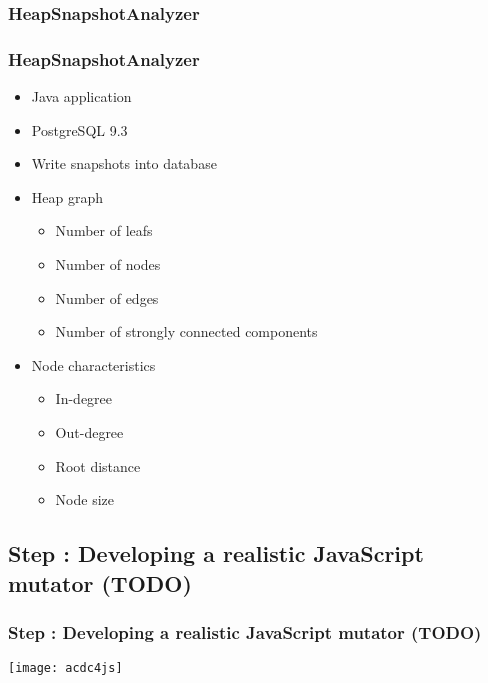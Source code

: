 \subsubsection{HeapSnapshotAnalyzer}
\begin{frame}
	\frametitle{HeapSnapshotAnalyzer}
	\begin{itemize}
		\item Java application
		\item PostgreSQL 9.3
		\item Write snapshots into database
			
		\pause
			
		\item Heap graph
		\begin{itemize}
			 \item Number of leafs
			 \item Number of nodes
			 \item Number of edges
			 \item Number of strongly connected components
		\end{itemize}
			
		\pause 
			
		\item Node characteristics
		\begin{itemize} 
			 \item In-degree
			 \item Out-degree
			 \item Root distance
			 \item Node size 
		\end{itemize}
	\end{itemize} 
\end{frame}
	
	
\subsection{Step \theStepCounter: Developing a realistic JavaScript mutator (TODO)}
\begin{frame}
	\frametitle{Step \theStepCounter: Developing a realistic JavaScript mutator (TODO)}
	\begin{center}
		\texttt{[image: acdc4js]}
	\end{center}
\end{frame}

